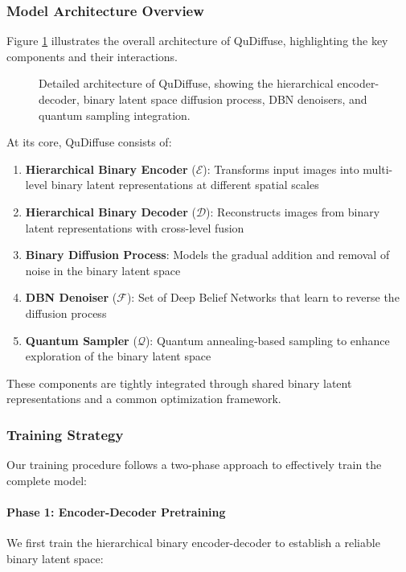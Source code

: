 \documentclass[10pt,twocolumn,letterpaper]{article}
\newcommand{\encoder}{\mathcal{E}}
\newcommand{\decoder}{\mathcal{D}}
\newcommand{\denoiser}{\mathcal{F}}
\newcommand{\sampling}{\mathcal{Q}}
\begin{document}
\subsubsection{Model Architecture Overview}

Figure \ref{fig:architecture} illustrates the overall architecture of QuDiffuse, highlighting the key components and their interactions.

\begin{figure}[t]
    \centering
    \caption{Detailed architecture of QuDiffuse, showing the hierarchical encoder-decoder, binary latent space diffusion process, DBN denoisers, and quantum sampling integration.}
    \label{fig:architecture}
\end{figure}

At its core, QuDiffuse consists of:

\begin{enumerate}
    \item \textbf{Hierarchical Binary Encoder} ($\encoder$): Transforms input images into multi-level binary latent representations at different spatial scales
    \item \textbf{Hierarchical Binary Decoder} ($\decoder$): Reconstructs images from binary latent representations with cross-level fusion
    \item \textbf{Binary Diffusion Process}: Models the gradual addition and removal of noise in the binary latent space
    \item \textbf{DBN Denoiser} ($\denoiser$): Set of Deep Belief Networks that learn to reverse the diffusion process
    \item \textbf{Quantum Sampler} ($\sampling$): Quantum annealing-based sampling to enhance exploration of the binary latent space
\end{enumerate}

These components are tightly integrated through shared binary latent representations and a common optimization framework.

\subsubsection{Training Strategy}

Our training procedure follows a two-phase approach to effectively train the complete model:

\paragraph{Phase 1: Encoder-Decoder Pretraining}
We first train the hierarchical binary encoder-decoder to establish a reliable binary latent space:
\end{document}
